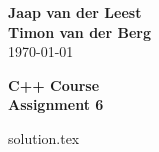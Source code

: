 \documentclass{article}[9pt]
\begin{document}
\begin{flushright}
	\textbf{Jaap van der Leest\\ Timon van der Berg \\ }
\today
\end{flushright}

\begin{center}
\textbf{C++ Course \\
Assignment 6} \\
\end{center}


    {solution.tex}
 
\end{document}
